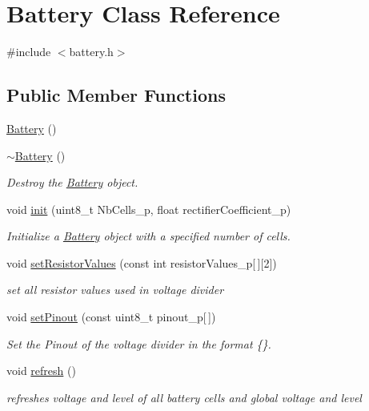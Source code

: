 \hypertarget{class_battery}{}\section{Battery Class Reference}
\label{class_battery}


{\ttfamily \#include $<$battery.\+h$>$}

\subsection*{Public Member Functions}
\begin{DoxyCompactItemize}
\item 
\hyperlink{class_battery_a36a6234c583e3b3506f4a77e3eb49989}{Battery} ()
\item 
\hyperlink{class_battery_a637d8766eb5cbdb33ab2a19a30622bc3}{$\sim$\+Battery} ()
\begin{DoxyCompactList}\small\item\em Destroy the \hyperlink{class_battery}{Battery} object. \end{DoxyCompactList}\item 
void \hyperlink{class_battery_aed541975df2c26475cbc0c37a9ddf659}{init} (uint8\+\_\+t Nb\+Cells\+\_\+p, float rectifier\+Coefficient\+\_\+p)
\begin{DoxyCompactList}\small\item\em Initialize a \hyperlink{class_battery}{Battery} object with a specified number of cells. \end{DoxyCompactList}\item 
void \hyperlink{class_battery_afb257ecd2eab7ed446d15ea9e78cc074}{set\+Resistor\+Values} (const int resistor\+Values\+\_\+p\mbox{[}$\,$\mbox{]}\mbox{[}2\mbox{]})
\begin{DoxyCompactList}\small\item\em set all resistor values used in voltage divider \end{DoxyCompactList}\item 
void \hyperlink{class_battery_a580d9582fbcf2c5f8185e3007852f73d}{set\+Pinout} (const uint8\+\_\+t pinout\+\_\+p\mbox{[}$\,$\mbox{]})
\begin{DoxyCompactList}\small\item\em Set the Pinout of the voltage divider in the format \{\}. \end{DoxyCompactList}\item 
void \hyperlink{class_battery_a7289442b8119494f06080d843c261c74}{refresh} ()
\begin{DoxyCompactList}\small\item\em refreshes voltage and level of all battery cells and global voltage and level \end{DoxyCompactList}\item 

\end{DoxyCompactItemize}
